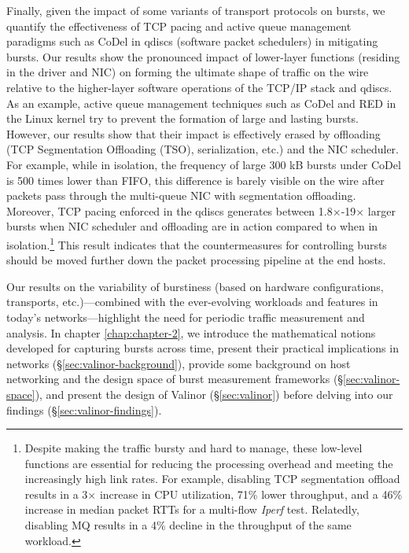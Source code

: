 Finally, given the impact of some variants of transport protocols on bursts, we quantify the effectiveness of TCP pacing and active queue management paradigms such as CoDel \cite{codel} in qdiscs (software packet schedulers) in mitigating bursts. 
%
Our results show the pronounced impact of lower-layer functions (residing in the driver and NIC) on forming the ultimate shape of traffic on the wire relative to the higher-layer software operations of the TCP/IP stack and qdiscs. 
As an example, active queue management techniques such as CoDel and RED in the Linux kernel try to prevent the formation of large and lasting bursts. However, our results show that their impact is effectively erased by offloading (TCP Segmentation Offloading (TSO), serialization, etc.) and the NIC scheduler. 
For example, while in isolation, the frequency of large 300 kB bursts under CoDel is 500 times lower than FIFO, this difference is barely visible on the wire after packets pass through the multi-queue NIC with segmentation offloading.
Moreover, TCP pacing enforced in the qdiscs generates between 1.8$\times$-19$\times$ larger bursts when NIC scheduler and offloading are in action compared to when in isolation.\footnote{Despite making the traffic bursty and hard to manage, these low-level functions are essential for reducing the processing overhead and meeting the increasingly high link rates. For example, disabling TCP segmentation offload results in a 3$\times$ increase in CPU utilization, 71\% lower throughput, and a 46\% increase in median packet RTTs for a multi-flow \textit{Iperf} test. 
Relatedly, disabling MQ results in a 4\% decline in the throughput of the same workload.
} 
This result indicates that the countermeasures for controlling bursts should be moved further down the packet processing pipeline at the end hosts. 

Our results on the variability of burstiness (based on hardware configurations, transports, etc.)---combined with the ever-evolving workloads and features in today's networks---highlight the need for periodic traffic measurement and analysis. 
In chapter \ref{chap:chapter-2}, we introduce the mathematical notions developed for capturing bursts across time, present their practical implications in networks (\S\ref{sec:valinor-background}), provide some background on host networking and the design space of burst measurement frameworks (\S\ref{sec:valinor-space}), and present the design of Valinor (\S\ref{sec:valinor}) before delving into our findings (\S\ref{sec:valinor-findings}).

